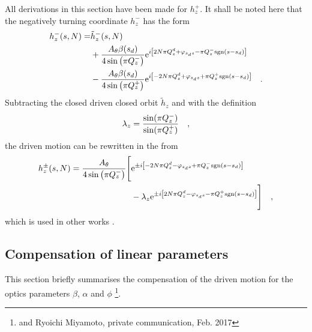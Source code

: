All derivations in this section have been made for $h_z^+$. It shall be noted here that the negatively turning
coordinate $h_z^-$ has the form
%
\begin{align}
    h_z^-(s, N) =
        &\tilde{h}_z^-(s, N) \notag \\
        &+ \frac{A_\theta\beta(s_d)}{4\sin\left( \pi Q_z^-\right)}
        \text{e}^{i\left[2N\pi Q^{d}_{z} + \varphi_{s_ds} - \pi Q_z^-\text{sgn}(s-s_d)\right]} 
        \notag \\
        &- \frac{A_\theta\beta(s_d)}{4\sin\left( \pi Q_z^+\right)}
        \text{e}^{i\left[-2N\pi Q^{d}_{z} + \varphi_{s_ds} + \pi Q_z^+\text{sgn}(s-s_d)\right]} 
    \quad .
    \label{eq_driven_simpl2_minus}
\end{align}
%
Subtracting the closed driven closed orbit $\tilde{h}_z$ and with the definition
%
\begin{equation}
    \lambda_z = \frac{\sin(\pi Q_z^-)}{\sin(\pi Q_z^+)}
    \quad ,
\end{equation}
%
the driven motion can be rewritten in the from
%
\begin{align}
    h_z^\pm(s,N) = 
        \frac{A_\theta}{4\sin\left( \pi Q_z^-\right)}
        \Bigg[ 
            &\text{e}^{\pm i\left[-2N\pi Q^{d}_{z} - \varphi_{s_ds} + \pi Q_z^-\text{sgn}(s-s_d)\right]} 
            \notag \\
            &- \lambda_z
             \text{e}^{\pm i\left[2N\pi Q^{d}_{z} - \varphi_{s_ds} - \pi Q_z^+\text{sgn}(s-s_d)\right]} 
        \Bigg]
    \quad ,
    \label{eq_driven_hz_final}
\end{align}
%
which is used in other works \cite{Miyamoto2008, Miyamoto2010}. 


\subsection{Compensation of linear parameters}

This section briefly summarises the compensation of the driven motion for the optics parameters
$\beta$, $\alpha$ and $\phi$ \footnote{\cite{Miyamoto2008} and Ryoichi Miyamoto, private communication, Feb. 2017}.

